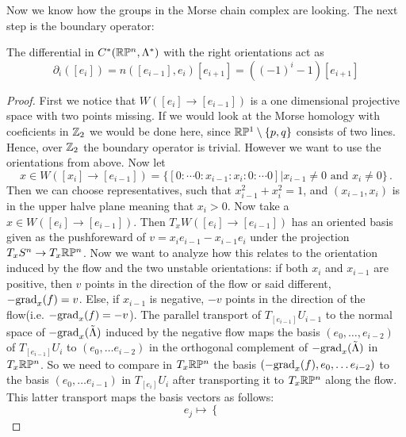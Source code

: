 \begin{example}
\begin{definition}[Orientations]
\begin{center}
				\end{center}
			\end{definition}
			Now we know how the groups in the Morse chain complex are looking. The next step is the boundary operator:
			\begin{lemma}
				The differential in $C^*(\mathbb{R}\mathbb{P}^n,\Lambda^*)$ with the right orientations act as
						\begin{equation*}
					\partial_i([e_i])=n([e_{i-1}],e_i) [e_{i+1}]= ({(-1)}^i-1)[e_{i+1}]
				\end{equation*}	
			\end{lemma}
		\begin{proof}
			First we notice that $W([e_i]\to [e_{i-1}])$ is a one dimensional projective space with two points missing. If we would look at the Morse homology with coeficients in $\mathbb{Z}_2$ we would be done here, since $\mathbb{R}\mathbb{P}^1\setminus \{p,q\}$ consists of two lines. Hence, over $\mathbb{Z}_2$ the boundary operator is trivial. However we want to use the orientations from above.
			Now let 
			\begin{equation*}
				x\in W([x_i]\to [e_{i-1}])=\{[0:\cdots 0:x_{i-1}:x_{i}:0:\cdots 0]|x_{i-1}\neq 0 \text{ and }x_i\neq 0 \}\,.
			\end{equation*} Then we can choose representatives, such that $x_{i-1}^2+x_i^2=1$, and $(x_{i-1},x_i)$ is in the upper halve plane meaning that $x_i>0$. Now take a $x\in W([e_i]\to [e_{i-1}])$. Then $T_xW([e_i]\to [e_{i-1}])$ has an oriented basis given as the pushforeward of $v=x_{i}e_{i-1}-x_{i-1}e_{i}$ under the projection $T_xS^n\to T_x\mathbb{R}\mathbb{P}^n$. Now we want to analyze how this relates to the orientation induced by the flow and the two unstable orientations: if both $x_i$ and $x_{i-1}$ are positive, then $v$ points in the direction of the flow or said different, $-\mathrm{grad}_x(f)=v$. Else, if $x_{i-1}$ is negative, $-v$ points in the direction of the flow(i.e. $-\mathrm{grad}_x(f)=-v$). The parallel transport of $T_{[e_{i-1}]}U_{i-1}$ to the normal space of $-\mathrm{grad}_x(\tilde{\Lambda})$ induced by the negative flow maps the basis $(e_{0},\dots, e_{i-2})$ of $T_{[e_{i-1}]}U_i$ to $(e_{0},\dots e_{i-2})$ in the orthogonal complement of $-\mathrm{grad}_x(\tilde{\Lambda})$ in $T_x\mathbb{R}\mathbb{P}^n$. So we need to compare in $T_x\mathbb{R}\mathbb{P}^n$ the basis $(-\mathrm{grad}_x(f),e_0,\dots e_{i-2})$ to the  basis $(e_0,\dots e_{i-1})$ in $T_{[e_i]}U_i$ after transporting it to $T_x\mathbb{R}\mathbb{P}^n$ along the flow. This latter transport maps the basis vectors as follows:
			\begin{equation*}
				e_j\mapsto \begin{cases*}

\end{cases*}
\end{equation*}
\end{proof}
\end{example}
